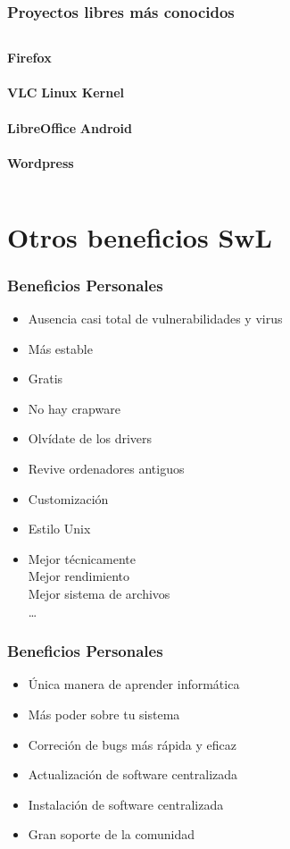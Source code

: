 \documentclass{beamer}
\begin{document}
\begin{frame}\frametitle{Proyectos libres más conocidos}
    \begin{columns}[c]
    \textbf{Firefox} \\~\\
    \textbf{VLC} 
    \textbf{Linux Kernel} \\~\\
    \textbf{LibreOffice} 
    \textbf{Android} \\~\\
    \textbf{Wordpress} 
    \end{columns}
\end{frame}

\section{Otros beneficios SwL}

\begin{frame}\frametitle{Beneficios Personales}
    \begin{itemize}
        \item Ausencia casi total de vulnerabilidades y virus \pause
        \item Más estable \pause
        \item Gratis \pause
        \item No hay crapware \pause
        \item Olvídate de los drivers \pause
        \item Revive ordenadores antiguos \pause
        \item Customización \pause
        \item Estilo Unix \pause
        \item Mejor técnicamente \\ \pause
            Mejor rendimiento \\ 
            Mejor sistema de archivos \\
            \ldots 
    \end{itemize}
\end{frame}

\begin{frame}\frametitle{Beneficios Personales}
    \begin{itemize}
        \item Única manera de aprender informática  \pause
        \item Más poder sobre tu sistema \pause
        \item Correción de bugs más rápida y eficaz \pause
        \item Actualización de software centralizada \pause
        \item Instalación de software centralizada \pause
        \item Gran soporte de la comunidad
    \end{itemize}
\end{frame}
\end{document}
